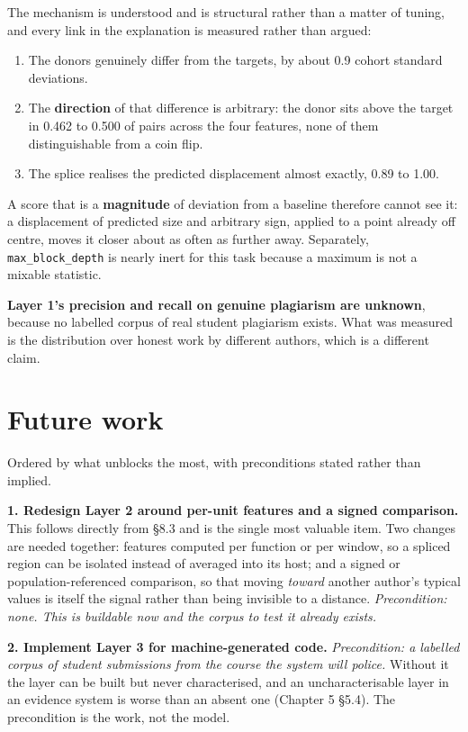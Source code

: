 The mechanism is understood and is structural rather than a matter of
tuning, and every link in the explanation is measured rather than
argued:

\begin{enumerate}
\def\labelenumi{\arabic{enumi}.}
\tightlist
\item
  The donors genuinely differ from the targets, by about 0.9 cohort
  standard deviations.
\item
  The \textbf{direction} of that difference is arbitrary: the donor sits
  above the target in 0.462 to 0.500 of pairs across the four features,
  none of them distinguishable from a coin flip.
\item
  The splice realises the predicted displacement almost exactly, 0.89 to
  1.00.
\end{enumerate}

A score that is a \textbf{magnitude} of deviation from a baseline
therefore cannot see it: a displacement of predicted size and arbitrary
sign, applied to a point already off centre, moves it closer about as
often as further away. Separately, \texttt{max\_block\_depth} is nearly
inert for this task because a maximum is not a mixable statistic.

\textbf{Layer 1's precision and recall on genuine plagiarism are
unknown}, because no labelled corpus of real student plagiarism exists.
What was measured is the distribution over honest work by different
authors, which is a different claim.

\hypertarget{future-work}{%
\section{Future work}\label{future-work}}

Ordered by what unblocks the most, with preconditions stated rather than
implied.

\textbf{1. Redesign Layer 2 around per-unit features and a signed
comparison.} This follows directly from \S{}8.3 and is the single most
valuable item. Two changes are needed together: features computed per
function or per window, so a spliced region can be isolated instead of
averaged into its host; and a signed or population-referenced
comparison, so that moving \emph{toward} another author's typical values
is itself the signal rather than being invisible to a distance.
\emph{Precondition: none. This is buildable now and the corpus to test
it already exists.}

\textbf{2. Implement Layer 3 for machine-generated code.}
\emph{Precondition: a labelled corpus of student submissions from the
course the system will police.} Without it the layer can be built but
never characterised, and an uncharacterisable layer in an evidence
system is worse than an absent one (Chapter 5 \S{}5.4). The precondition is
the work, not the model.

